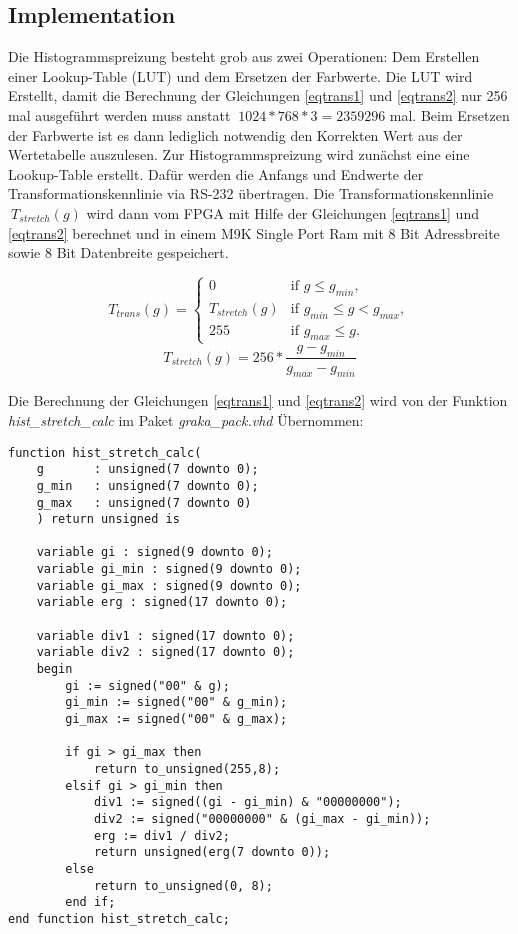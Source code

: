\documentclass[%
  paper=A4, %
  pagesize, %
  12pt,
  ngerman   %
]{scrreprt}  %
\begin{document}
\subsection{Implementation}
Die Histogrammspreizung besteht grob aus zwei Operationen: Dem Erstellen einer Lookup-Table (LUT) und dem Ersetzen der Farbwerte. Die LUT wird Erstellt, damit die Berechnung der Gleichungen \ref{eqtrans1} und \ref{eqtrans2} nur 256 mal ausgeführt werden muss anstatt $\ 1024 * 768 * 3 = 2359296$ mal. Beim Ersetzen der Farbwerte ist es dann lediglich notwendig den Korrekten Wert aus der Wertetabelle auszulesen. Zur Histogrammspreizung wird zunächst eine eine Lookup-Table erstellt. Dafür werden die Anfangs und Endwerte der Transformationskennlinie via RS-232 übertragen. Die Transformationskennlinie $\ T_{stretch}(g)$ wird dann vom FPGA mit Hilfe der Gleichungen \ref{eqtrans1} und \ref{eqtrans2} berechnet und in einem M9K Single Port Ram mit 8 Bit Adressbreite sowie 8 Bit Datenbreite gespeichert.


\begin{equation}
\label{eqtrans1}
T_{trans}(g) = 
\begin{cases}
0 & \text{if } g \leq g_{min},\\
T_{stretch}(g) & \text{if } g_{min} \leq g < g_{max},\\
255 & \text{if } g_{max} \leq g.
\end{cases}
\end{equation}
\begin{equation}
\label{eqtrans2}
T_{stretch}(g) = 256*\dfrac{g - g_{min}}{g_{max} - g_{min}}
\end{equation}

Die Berechnung der Gleichungen \ref{eqtrans1} und \ref{eqtrans2} wird von der Funktion \emph{hist\_stretch\_calc} im Paket \emph{graka\_pack.vhd} Übernommen:

\lstset{numbers = left,
numberstyle =\tiny,
language = VHDL, 
tabsize = 4,
keywordstyle=\color{blue},          %
commentstyle=\color{dkgreen},       %
basicstyle= \footnotesize\ttfamily
}
\begin{lstlisting}
function hist_stretch_calc(
	g 		: unsigned(7 downto 0);
	g_min 	: unsigned(7 downto 0);
	g_max 	: unsigned(7 downto 0)
	) return unsigned is
	
	variable gi : signed(9 downto 0);
	variable gi_min : signed(9 downto 0);
	variable gi_max : signed(9 downto 0);
	variable erg : signed(17 downto 0);
	
	variable div1 : signed(17 downto 0);
	variable div2 : signed(17 downto 0);
	begin
		gi := signed("00" & g);
		gi_min := signed("00" & g_min);
		gi_max := signed("00" & g_max);
		
		if gi > gi_max then
			return to_unsigned(255,8);
		elsif gi > gi_min then
			div1 := signed((gi - gi_min) & "00000000");
			div2 := signed("00000000" & (gi_max - gi_min));
			erg := div1 / div2;
			return unsigned(erg(7 downto 0));
		else
			return to_unsigned(0, 8);
		end if;
end function hist_stretch_calc;
\end{lstlisting}
\end{document}
